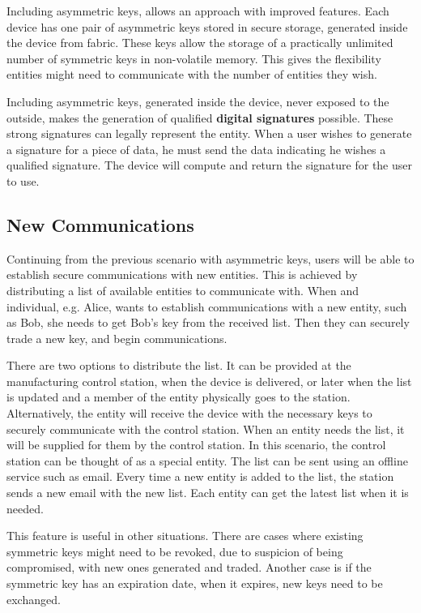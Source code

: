 Including asymmetric keys, allows an approach with improved features.
Each device has one pair of asymmetric keys stored in secure storage, generated inside the device from fabric. These keys allow the storage of a practically unlimited number of symmetric keys in non-volatile memory. This gives the flexibility entities might need to communicate with the number of entities they wish.

Including asymmetric keys, generated inside the device, never exposed to the outside, makes the generation of qualified \textbf{digital signatures} possible. These strong signatures can legally represent the entity. When a user wishes to generate a signature for a piece of data, he must send the data indicating he wishes a qualified signature. The device will compute and return the signature for the user to use.

\subsection{New Communications}\label{chap:problem:scenarios:keys}
Continuing from the previous scenario with asymmetric keys, users will be able to establish secure communications with new entities. This is achieved by distributing a list of available entities to communicate with.
When and individual, e.g. Alice, wants to establish communications with a new entity, such as Bob, she needs to get Bob's key from the received list. Then they can securely trade a new key, and begin communications.

There are two options to distribute the list.
It can be provided at the manufacturing control station, when the device is delivered, or later when the list is updated and a member of the entity physically goes to the station.
Alternatively, the entity will receive the device with the necessary keys to securely communicate with the control station. When an entity needs the list, it will be supplied for them by the control station. In this scenario, the control station can be thought of as a special entity.
The list can be sent using an offline service such as email. Every time a new entity is added to the list, the station sends a new email with the new list. Each entity can get the latest list when it is needed.

This feature is useful in other situations. There are cases where existing symmetric keys might need to be revoked, due to suspicion of being compromised, with new ones generated and traded.
Another case is if the symmetric key has an expiration date, when it expires, new keys need to be exchanged.

